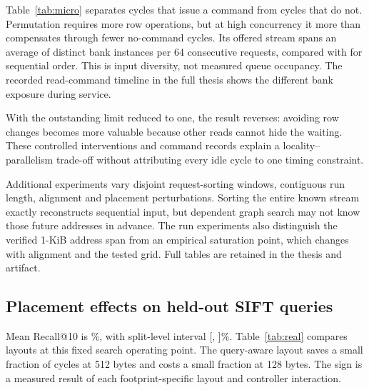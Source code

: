 \documentclass[conference]{IEEEtran}
\begin{document}
\begin{table}[htbp]\centering\small\setlength{\tabcolsep}{4pt}
\caption{Command-level explanation of the controlled ordering experiment. Limit is the maximum number of outstanding reads. ACT opens a row; PRE closes one. ``No command'' counts controller cycles in which no command issues, including timing waits and final draining. It is not a count of one specific stall cause.}\label{tab:micro}

\end{table}

Table~\ref{tab:micro} separates cycles that issue a command from cycles that do not. Permutation requires more row operations, but at high concurrency it more than compensates through fewer no-command cycles. Its offered stream spans an average of \RandomBanks{} distinct bank instances per 64 consecutive requests, compared with \SequentialBanks{} for sequential order. This is input diversity, not measured queue occupancy. The recorded read-command timeline in the full thesis shows the different bank exposure during service.



With the outstanding limit reduced to one, the result reverses: avoiding row changes becomes more valuable because other reads cannot hide the waiting. These controlled interventions and command records explain a locality--parallelism trade-off without attributing every idle cycle to one timing constraint.

Additional experiments vary disjoint request-sorting windows, contiguous run length, alignment and placement perturbations. Sorting the entire known stream exactly reconstructs sequential input, but dependent graph search may not know those future addresses in advance. The run experiments also distinguish the verified 1-KiB address span from an empirical saturation point, which changes with alignment and the tested grid. Full tables are retained in the thesis and artifact.

\subsection{Placement effects on held-out SIFT queries}
Mean Recall@10 is \SiftRecall\%, with split-level interval [\SiftRecallLow, \SiftRecallHigh]\%. Table~\ref{tab:real} compares layouts at this fixed search operating point. The query-aware layout saves a small fraction of cycles at 512 bytes and costs a small fraction at 128 bytes. The sign is a measured result of each footprint-specific layout and controller interaction.
\end{document}
